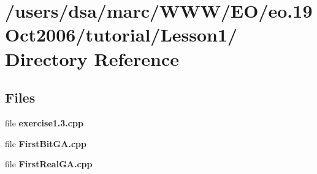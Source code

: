 \section{/users/dsa/marc/WWW/EO/eo.19Oct2006/tutorial/Lesson1/ Directory Reference}
\label{dir_000019}
\subsection*{Files}
\begin{CompactItemize}
\item 
file {\bf exercise1.3.cpp}
\item 
file {\bf FirstBitGA.cpp}
\item 
file {\bf FirstRealGA.cpp}
\end{CompactItemize}
